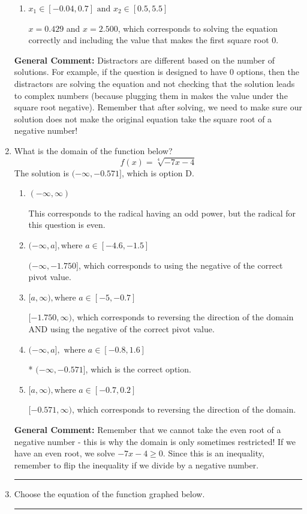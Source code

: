 \documentclass{extbook}[14pt]
\newcommand{\litem}[1]{\item #1

\rule{\textwidth}{0.4pt}}
\begin{document}
\begin{enumerate}
{\begin{enumerate}[label=\Alph*.]
$x = -0.400$ and $x = 2.500$, which corresponds to solving each radical separately for 0.
\item \( x_1 \in [-0.04, 0.7] \text{ and } x_2 \in [0.5,5.5] \)

$x = 0.429$ and $x = 2.500$, which corresponds to solving the equation correctly and including the value that makes the first square root 0.
\end{enumerate}

\textbf{General Comment:} Distractors are different based on the number of solutions. For example, if the question is designed to have 0 options, then the distractors are solving the equation and not checking that the solution leads to complex numbers (because plugging them in makes the value under the square root negative). Remember that after solving, we need to make sure our solution does not make the original equation take the square root of a negative number!
}
\litem{
What is the domain of the function below?
\[ f(x) = \sqrt[4]{-7 x - 4} \]The solution is \( (-\infty, -0.571] \), which is option D.\begin{enumerate}[label=\Alph*.]
\item \( (-\infty, \infty) \)

This corresponds to the radical having an odd power, but the radical for this question is even.
\item \( (-\infty, a], \text{where } a \in [-4.6, -1.5] \)

$(-\infty, -1.750]$, which corresponds to using the negative of the correct pivot value.
\item \( [a, \infty), \text{where } a \in [-5, -0.7] \)

$[-1.750, \infty)$, which corresponds to reversing the direction of the domain AND using the negative of the correct pivot value.
\item \( (-\infty, a], \text{ where } a \in [-0.8, 1.6] \)

* $(-\infty, -0.571]$, which is the correct option.
\item \( [a, \infty), \text{where } a \in [-0.7, 0.2] \)

 $[-0.571, \infty)$, which corresponds to reversing the direction of the domain.
\end{enumerate}

\textbf{General Comment:} Remember that we cannot take the even root of a negative number - this is why the domain is only sometimes restricted! If we have an even root, we solve $-7 x - 4 \geq 0$. Since this is an inequality, remember to flip the inequality if we divide by a negative number.
}
\litem{
Choose the equation of the function graphed below.

}
\end{enumerate}
\end{document}

